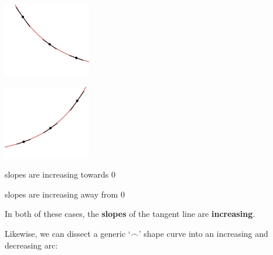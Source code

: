 \documentclass{ximera}
\begin{document}
\begin{center}

\begin{multicols}{2}

\includegraphics[width=1.5in]{./AppDerivativesGraphics/DecCU.png} 

\includegraphics[width=1.5in]{./AppDerivativesGraphics/IncCU.png} 


\end{multicols}

\end{center}

\begin{center}

\begin{multicols}{2}

slopes are increasing towards $0$

slopes are increasing away from $0$

\end{multicols}

\end{center}

In both of these cases, the \textbf{slopes} of the tangent line are \textbf{increasing}.  

\medskip

Likewise, we can dissect a generic `$\frown$' shape curve into an increasing and decreasing arc:
\end{document}
